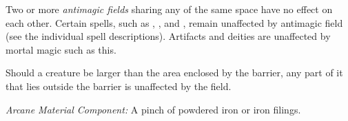 {	Two or more \emph{antimagic fields} sharing any of the same space have no effect on each other. Certain spells, such as , , and , remain unaffected by antimagic field (see the individual spell descriptions). Artifacts and deities are unaffected by mortal magic such as this.

	Should a creature be larger than the area enclosed by the barrier, any part of it that lies outside the barrier is unaffected by the field.

	\textit{Arcane Material Component:}
	A pinch of powdered iron or iron filings.

}
